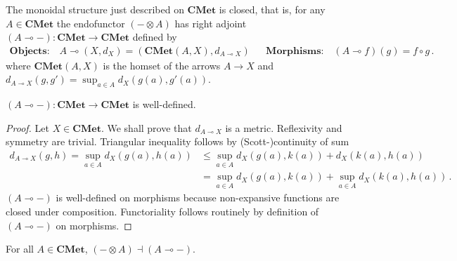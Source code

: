 \documentclass[a4paper,UKenglish,cleveref, autoref, thm-restate]{lipics-v2021}
\newcommand{\lol}{\mathbin{\multimap}}
\newcommand{\cat}[1]{\mathbf{#1}}
\newcommand{\CMet}{\cat{CMet}}
\newcommand{\mprod}{\otimes}
\newcommand{\mexp}{\lol}
\begin{document}
The monoidal structure just described on $\CMet$ is closed, that is, for any $A \in \CMet$ the endofunctor 
$(- \mprod A)$ has right adjoint $(A \mexp -) \colon \CMet \to \CMet$ defined by 
\begin{align*}
\textbf{Objects:}\quad
A \mexp (X, d_X) = (\CMet(A,X), d_{A \mexp X})
&&
\textbf{Morphisms:}\quad
(A \mexp f)(g) = f \circ g \,.
\end{align*}
where $\CMet(A,X)$ is the homset of the arrows $A \to X$ and 
  $d_{A \mexp X}(g,g') = \sup_{a \in A} d_X(g(a), g'(a))$.
\begin{proposition}
$(A \mexp -) \colon \CMet \to \CMet$ is well-defined.
\end{proposition}
\begin{proof}
Let $X \in \CMet$. We shall prove that $d_{A \mexp X}$ is a metric. 
Reflexivity and symmetry are trivial. Triangular inequality follows
by (Scott-)continuity of sum
\begin{align*}
    d_{A \mexp X}(g,h) 
    = \sup_{a \in A} d_X(g(a), h(a)) %
    &\leq \sup_{a \in A} d_X(g(a), k(a)) + d_X(k(a), h(a)) \\
    & = \sup_{a \in A} d_X(g(a), k(a)) + \sup_{a \in A} d_X(k(a), h(a)) \,.
\end{align*}
$(A \mexp -)$ is well-defined on morphisms because non-expansive functions are closed under composition.  
Functoriality follows routinely by definition of $(A \mexp -)$ on morphisms.
\end{proof}
\begin{proposition}
For all $A \in \CMet$, $(- \mprod A)  \dashv  (A \mexp -)$.
\end{proposition}
\end{document}
